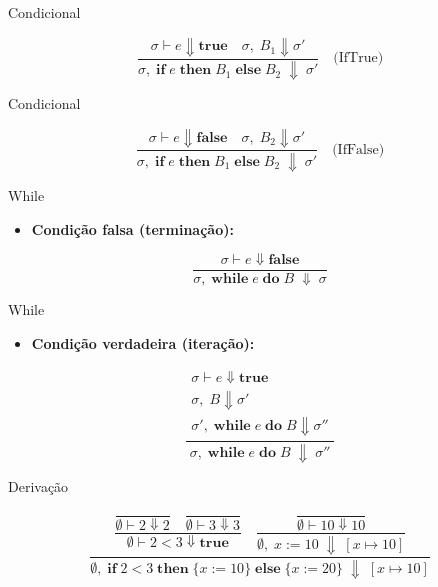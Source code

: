 \begin{frame}{Condicional}

    \[\frac{\sigma \vdash e \Downarrow \mathbf{true} \quad \sigma,\; B_1 \Downarrow \sigma'}
    {\sigma,\; \mathbf{if}\; e\; \mathbf{then}\; B_1\; \mathbf{else}\; B_2 \;\Downarrow\; \sigma'}
    \quad\text{(IfTrue)}\]
\end{frame}

\begin{frame}{Condicional}

    \[\frac{\sigma \vdash e \Downarrow \mathbf{false} \quad \sigma,\; B_2 \Downarrow \sigma'}
    {\sigma,\; \mathbf{if}\; e\; \mathbf{then}\; B_1\; \mathbf{else}\; B_2 \;\Downarrow\; \sigma'}
    \quad\text{(IfFalse)}\]
\end{frame}

\begin{frame}{While}

    \begin{itemize}

        \item
        \textbf{Condição falsa (terminação):}
    \end{itemize}

    \[\frac{\sigma \vdash e \Downarrow \mathbf{false}}
    {\sigma,\; \mathbf{while}\; e\; \mathbf{do}\; B \;\Downarrow\; \sigma}
    \]
\end{frame}

\begin{frame}{While}

    \begin{itemize}

        \item
        \textbf{Condição verdadeira (iteração):}
    \end{itemize}

    \[\frac{\begin{array}{c}\sigma \vdash e \Downarrow \mathbf{true}\\ \sigma,\; B
    \Downarrow \sigma'\\ \sigma',\; \mathbf{while}\; e\; \mathbf{do}\; B \Downarrow
    \sigma'' \end{array}}{\sigma,\; \mathbf{while}\; e\; \mathbf{do}\; B
    \;\Downarrow\; \sigma''}\]
\end{frame}

\begin{frame}{Derivação}

    \[\dfrac{
    \dfrac{
    \dfrac{}{\emptyset \vdash 2 \Downarrow 2}
    \quad
    \dfrac{}{\emptyset \vdash 3 \Downarrow 3}
    }{\emptyset \vdash 2 < 3 \Downarrow \mathbf{true}}
    \quad
    \dfrac{
    \dfrac{}{\emptyset \vdash 10 \Downarrow 10}
    }{\emptyset,\; x \mathbin{:=} 10 \;\Downarrow\; [x \mapsto 10]}
    }{\emptyset,\; \mathbf{if}\; 2<3\; \mathbf{then}\; \{x \mathbin{:=} 10\}\; \mathbf{else}\; \{x \mathbin{:=} 20\} \;\Downarrow\; [x \mapsto 10]}\]
\end{frame}


